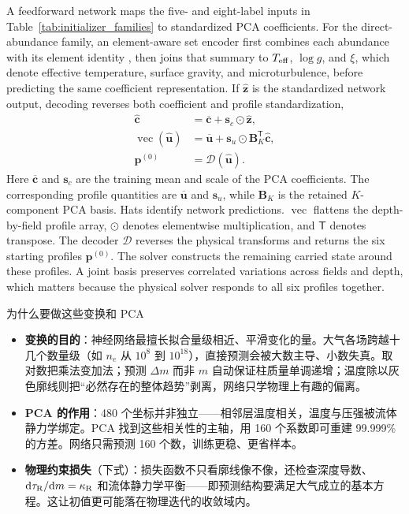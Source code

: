 \begin{EN}
A feedforward network maps the five- and eight-label inputs in
Table~\ref{tab:initializer_families} to standardized PCA coefficients. For the
direct-abundance family, an element-aware set encoder first combines each
abundance with its element identity \citep{Zaheer2017}, then joins that summary to
$T_{\rm eff}$, $\log g$, and $\xi$, which denote effective temperature,
surface gravity, and microturbulence, before
predicting the same coefficient representation. If $\widehat{\mathbf z}$ is
the standardized network output, decoding reverses both coefficient and
profile standardization,
\begin{equation}
\begin{aligned}
\widehat{\mathbf c}
&=\overline{\mathbf c}+\mathbf{s}_{c}\odot\widehat{\mathbf z},
\\
\operatorname{vec}(\widehat{\mathbf u})
&=\overline{\mathbf u}
+\mathbf{s}_{u}\odot\mathbf{B}_{K}^{\mathsf T}\widehat{\mathbf c},
\\
\mathbf{p}^{(0)}&=\mathcal{D}(\widehat{\mathbf{u}}).
\end{aligned}
\end{equation}
\noindent Here $\overline{\mathbf c}$ and $\mathbf{s}_c$ are the training mean
and scale of the PCA coefficients. The corresponding profile quantities are
$\overline{\mathbf u}$ and $\mathbf{s}_u$, while $\mathbf{B}_K$ is the retained
$K$-component PCA basis. Hats identify network predictions.
$\operatorname{vec}$ flattens the depth-by-field profile array, $\odot$
denotes elementwise multiplication, and $\mathsf T$ denotes transpose. The
decoder $\mathcal{D}$ reverses the physical transforms and returns the six
starting profiles $\mathbf{p}^{(0)}$. The solver constructs the remaining
carried state around these profiles.
A joint basis preserves correlated variations across fields and depth, which
matters because the physical solver responds to all six profiles together.
\end{EN}

\begin{physbox}{为什么要做这些变换和 PCA}
\begin{itemize}
\item \textbf{变换的目的}：神经网络最擅长拟合量级相近、平滑变化的量。大气各场跨越十几个数量级（如 $n_e$ 从 $10^8$ 到 $10^{18}$），直接预测会被大数主导、小数失真。取对数把乘法变加法；预测 $\Delta m$ 而非 $m$ 自动保证柱质量单调递增；温度除以灰色廓线则把“必然存在的整体趋势”剥离，网络只学物理上有趣的偏离。
\item \textbf{PCA 的作用}：480 个坐标并非独立——相邻层温度相关，温度与压强被流体静力学绑定。PCA 找到这些相关性的主轴，用 160 个系数即可重建 99.999\% 的方差。网络只需预测 160 个数，训练更稳、更省样本。
\item \textbf{物理约束损失}（下式）：损失函数不只看廓线像不像，还检查深度导数、$\mathrm{d}\tau_{\rm R}/\mathrm{d}m=\kappa_{\rm R}$ 和流体静力学平衡——即预测结构要满足大气成立的基本方程。这让初值更可能落在物理迭代的收敛域内。
\end{itemize}
\end{physbox}

